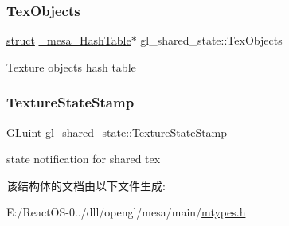\subsubsection{\texorpdfstring{Tex\+Objects}{TexObjects}}
{\footnotesize\ttfamily \hyperlink{interfacestruct}{struct} \hyperlink{struct__mesa___hash_table}{\+\_\+mesa\+\_\+\+Hash\+Table}$\ast$ gl\+\_\+shared\+\_\+state\+::\+Tex\+Objects}

Texture objects hash table \mbox{\label{structgl__shared__state_aadfde9b62cb193b3a2852566f61fff9d}} 
\subsubsection{\texorpdfstring{Texture\+State\+Stamp}{TextureStateStamp}}
{\footnotesize\ttfamily G\+Luint gl\+\_\+shared\+\_\+state\+::\+Texture\+State\+Stamp}

state notification for shared tex 

该结构体的文档由以下文件生成\+:\begin{DoxyCompactItemize}
\item 
E\+:/\+React\+O\+S-\/0../dll/opengl/mesa/main/\hyperlink{mtypes_8h}{mtypes.\+h}\end{DoxyCompactItemize}
